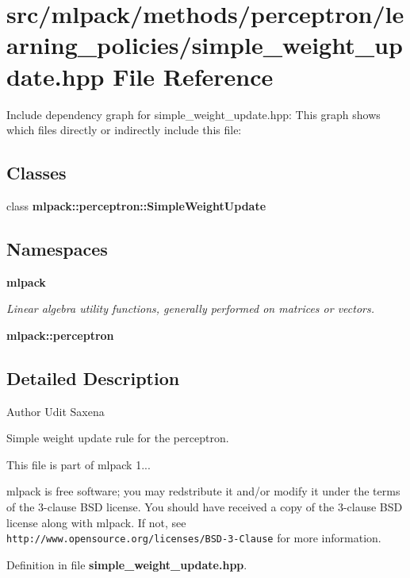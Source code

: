 \section{src/mlpack/methods/perceptron/learning\-\_\-policies/simple\-\_\-weight\-\_\-update.hpp File Reference}
\label{simple__weight__update_8hpp}
Include dependency graph for simple\-\_\-weight\-\_\-update.\-hpp\-:
This graph shows which files directly or indirectly include this file\-:
\subsection*{Classes}
\begin{DoxyCompactItemize}
\item 
class {\bf mlpack\-::perceptron\-::\-Simple\-Weight\-Update}
\end{DoxyCompactItemize}
\subsection*{Namespaces}
\begin{DoxyCompactItemize}
\item 
{\bf mlpack}
\begin{DoxyCompactList}\small\item\em Linear algebra utility functions, generally performed on matrices or vectors. \end{DoxyCompactList}\item 
{\bf mlpack\-::perceptron}
\end{DoxyCompactItemize}


\subsection{Detailed Description}
\begin{DoxyAuthor}{Author}
Udit Saxena
\end{DoxyAuthor}
Simple weight update rule for the perceptron.

This file is part of mlpack 1...

mlpack is free software; you may redstribute it and/or modify it under the terms of the 3-\/clause B\-S\-D license. You should have received a copy of the 3-\/clause B\-S\-D license along with mlpack. If not, see {\tt http\-://www.\-opensource.\-org/licenses/\-B\-S\-D-\/3-\/\-Clause} for more information. 

Definition in file {\bf simple\-\_\-weight\-\_\-update.\-hpp}.

